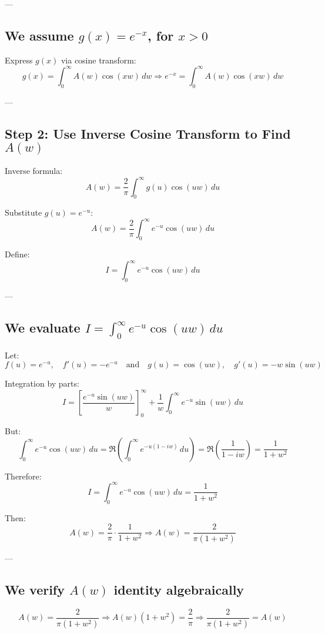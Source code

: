 \documentclass{article}
\begin{document}
---

\subsection*{We assume \( g(x) = e^{-x} \), for \( x > 0 \)}

Express \( g(x) \) via cosine transform:
\[
g(x) = \int_0^\infty A(w) \cos(xw) \, dw
\Rightarrow
e^{-x} = \int_0^\infty A(w) \cos(xw) \, dw
\]

---

\subsection*{Step 2: Use Inverse Cosine Transform to Find \( A(w) \)}

Inverse formula:
\[
A(w) = \frac{2}{\pi} \int_0^\infty g(u) \cos(uw) \, du
\]

Substitute \( g(u) = e^{-u} \):
\[
A(w) = \frac{2}{\pi} \int_0^\infty e^{-u} \cos(uw) \, du
\]

Define:
\[
I = \int_0^\infty e^{-u} \cos(uw) \, du
\]

---

\subsection*{We evaluate \( I = \int_0^\infty e^{-u} \cos(uw) \, du \)}

Let:
\[
f(u) = e^{-u}, \quad f'(u) = -e^{-u}
\quad \text{and} \quad
g(u) = \cos(uw), \quad g'(u) = -w \sin(uw)
\]

Integration by parts:
\[
I = \left[ \frac{e^{-u} \sin(uw)}{w} \right]_0^\infty + \frac{1}{w} \int_0^\infty e^{-u} \sin(uw) \, du
\]

But:
\[
\int_0^\infty e^{-u} \cos(uw) \, du = \Re\left( \int_0^\infty e^{-u(1 - iw)} \, du \right)
= \Re\left( \frac{1}{1 - iw} \right)
= \frac{1}{1 + w^2}
\]

Therefore:
\[
I = \int_0^\infty e^{-u} \cos(uw) \, du = \frac{1}{1 + w^2}
\]

Then:
\[
A(w) = \frac{2}{\pi} \cdot \frac{1}{1 + w^2}
\Rightarrow
A(w) = \frac{2}{\pi(1 + w^2)}
\]

---

\subsection*{We verify \( A(w) \) identity algebraically}

\[
A(w) = \frac{2}{\pi(1 + w^2)} \Rightarrow A(w)(1 + w^2) = \frac{2}{\pi}
\Rightarrow \frac{2}{\pi(1 + w^2)} = A(w)
\]
\end{document}
